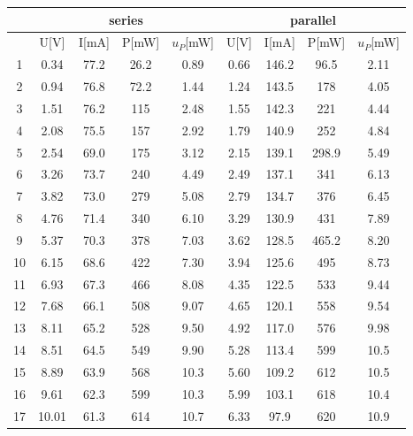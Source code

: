 \documentclass[12pt]{article}
\begin{document}
\begin{table}[H]
\centering
\begin{tabular}{|c|c|c|c|c|c|c|c|c|}
\hline
   & \multicolumn{4}{c|}{series}      & \multicolumn{4}{c|}{parallel}      \\ \hline
   & U{[}V{]} & I{[}mA{]} & P{[}mW{]}&$u_P$[mW] & U{[}V{]} & I{[}mA{]} & P{[}mW{]}&$u_P$[mW] \\ \hline
1  & 0.34     & 77.2      & 26.2 &0.89    & 0.66     & 146.2     & 96.5  &2.11   \\ \hline
2  & 0.94     & 76.8      & 72.2 &1.44    & 1.24     & 143.5     & 178   &4.05   \\ \hline
3  & 1.51     & 76.2      & 115  &2.48    & 1.55     & 142.3     & 221   &4.44   \\ \hline
4  & 2.08     & 75.5      & 157  &2.92    & 1.79     & 140.9     & 252   &4.84   \\ \hline
5  & 2.54     & 69.0      & 175  &3.12    & 2.15     & 139.1     & 298.9 &5.49   \\ \hline
6  & 3.26     & 73.7      & 240  &4.49    & 2.49     & 137.1     & 341   &6.13   \\ \hline
7  & 3.82     & 73.0      & 279  &5.08    & 2.79     & 134.7     & 376   &6.45   \\ \hline
8  & 4.76     & 71.4      & 340  &6.10    & 3.29     & 130.9     & 431   &7.89   \\ \hline
9  & 5.37     & 70.3      & 378  &7.03    & 3.62     & 128.5     & 465.2 &8.20   \\ \hline
10 & 6.15     & 68.6      & 422  &7.30    & 3.94     & 125.6     & 495   &8.73   \\ \hline
11 & 6.93     & 67.3      & 466  &8.08    & 4.35     & 122.5     & 533   &9.44   \\ \hline
12 & 7.68     & 66.1      & 508  &9.07    & 4.65     & 120.1     & 558   &9.54   \\ \hline
13 & 8.11     & 65.2      & 528  &9.50    & 4.92     & 117.0     & 576   &9.98   \\ \hline
14 & 8.51     & 64.5      & 549  &9.90    & 5.28     & 113.4     & 599   &10.5   \\ \hline
15 & 8.89     & 63.9      & 568  &10.3    & 5.60     & 109.2     & 612   &10.5   \\ \hline
16 & 9.61     & 62.3      & 599  &10.3    & 5.99     & 103.1     & 618   &10.4   \\ \hline
17 & 10.01    & 61.3      & 614  &10.7    & 6.33     & 97.9      & 620   &10.9   \\ \hline

\end{tabular}
\end{table}
\end{document}
